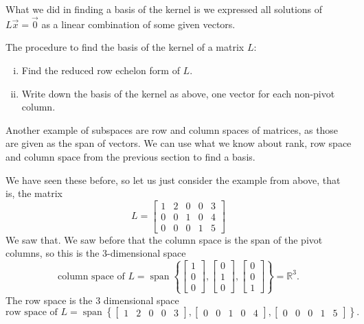 What we did in finding a basis of the kernel is we expressed all
solutions of
$L \vec{x} = \vec{0}$ as a linear combination of some given vectors.

\pagebreak[2]
The procedure to find the basis of the kernel of a matrix $L$:
\begin{enumerate}[(i)]
\item Find the reduced row echelon form of $L$.
\item Write down the basis of the kernel as above, one vector for each
non-pivot column.
\end{enumerate}

Another example of subspaces are row and column spaces of matrices,
as those are given as the span of vectors.
We can use
what we know about rank, row space and column space
from the previous section to find a basis.

\begin{example}
We have seen these before, so let us just consider the example from above,
that is, the matrix
\begin{equation*}
L =
\begin{bmatrix}
{1} & 2 & 0 & 0 & 3 \\
0 & 0 & {1} & 0 & 4 \\
0 & 0 & 0 & {1} & 5
\end{bmatrix} 
\end{equation*}
We saw that.  We saw before that the column space is the span of
the pivot columns, so this is
the 3-dimensional space
\begin{equation*}
\text{column space of $L$} =
\operatorname{span} \left\{
\begin{bmatrix}
{1} \\
0 \\
0
\end{bmatrix} 
,
\begin{bmatrix}
 0 \\
 {1} \\
 0 
\end{bmatrix} 
,
\begin{bmatrix}
0 \\
0 \\
{1} 
\end{bmatrix} 
\right\}
= {\mathbb{R}}^3 .
\end{equation*}
The row space is the 3 dimensional space
\begin{equation*}
\text{row space of $L$} =
\operatorname{span} \left\{
\begin{bmatrix}
{1} & 2 & 0 & 0 & 3
\end{bmatrix} 
,
\begin{bmatrix}
0 & 0 & {1} & 0 & 4
\end{bmatrix} 
,
\begin{bmatrix}
0 & 0 & 0 & {1} & 5
\end{bmatrix} 
\right\} .
\end{equation*}
\end{example}

